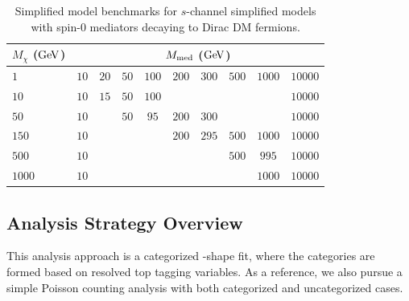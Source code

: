 \begin{table}[!ht]
\centering
\begin{tabular}{|l|ccccccccc|}
\hline
  \multicolumn{1}{|c|}{$M_{\chi}$ ($\mathrm{Ge\kern -0.1em V}$)} & \multicolumn{9}{|c|}{$M_{\mbox{\scriptsize{med}}}$ ($\mathrm{Ge\kern -0.1em V}$)} \\
\hline
  $1$    & $10$ & $20$ & $50$ & $100$ & $200$ & $300$ & $500$ & $1000$ & $10000$ \\
  $10$   & $10$ & $15$ & $50$ & $100$ &       &       &       &        & $10000$ \\
  $50$   & $10$ &      & $50$ & $95$  & $200$ & $300$ &       &        & $10000$ \\
  $150$  & $10$ &      &      &       & $200$ & $295$ & $500$ & $1000$ & $10000$ \\
  $500$  & $10$ &      &      &       &       &       & $500$ & $995$  & $10000$ \\
  $1000$ & $10$ &      &      &       &       &       &       & $1000$ & $10000$ \\
\hline
\end{tabular}
\caption{Simplified model benchmarks for $s$-channel simplified models with spin-$0$ mediators decaying to Dirac DM fermions.}
\label{tab:dmf}
\end{table}

\subsection{Analysis Strategy Overview}
\label{subsec:intro_anastrat}
This analysis approach is a categorized \met-shape fit, where the categories are formed based on resolved top tagging variables. As a reference, we also pursue a simple Poisson counting analysis with both categorized and uncategorized cases.

